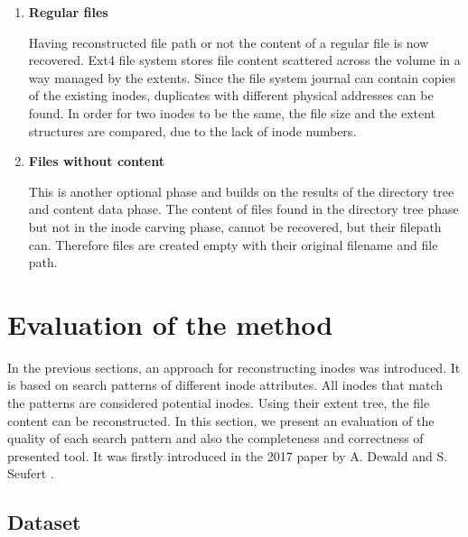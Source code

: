 \documentclass{acm_proc_article-sp}
\begin{document}
\begin{enumerate}
\item \textbf{Regular files}

Having reconstructed file path or not the content of a regular file is now recovered. Ext4 file system stores file content scattered across the volume in a way managed by the extents. Since the file system journal can contain copies of the existing inodes, duplicates with different physical addresses can be found. In order for two inodes to be the same, the file size and the extent structures are compared, due to the lack of inode numbers.
\item \textbf{Files without content}

This is another optional phase and builds on the results of the directory tree and content data phase. The content of files found in the directory tree phase but not in the inode carving phase, cannot be recovered, but their filepath can. Therefore files are created empty with their original filename and file path.
\end{enumerate}

\section{Evaluation of the method}

In the previous sections, an approach for reconstructing inodes was introduced. It is based on search patterns of different inode attributes. All inodes that match the patterns are considered potential inodes. Using their extent tree, the file content can be reconstructed. In this section, we present an evaluation of the quality of each search pattern and also the completeness and correctness of presented tool. It was firstly introduced in the 2017 paper by A. Dewald and S. Seufert \cite{afeic}.

\subsection{Dataset}
\end{document}

